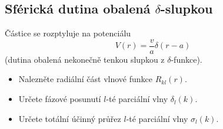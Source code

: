 \subsection{Sférická dutina obalená $\delta$-slupkou}
	Částice se rozptyluje na potenciálu
	\begin{equation}
		V(r)
			=\frac{v}{a}\delta(r-a)
	\end{equation}
	(dutina obalená nekonečně tenkou slupkou z $\delta$-funkce).
	
	\begin{itemize}
		\item 
			Nalezněte radiální část vlnové funkce $R_{kl}(r)$.
			
		\item
			Určete fázové posunutí $l$-té parciální vlny $\delta_{l}(k)$.
			
		\item
			Určete totální účinný průřez $l$-té parciální vlny $\sigma_{l}(k)$.
	\end{itemize}

